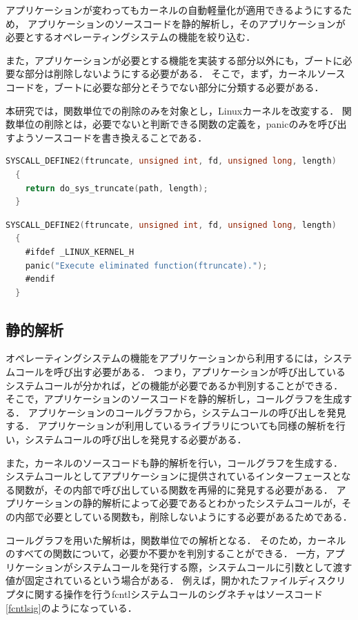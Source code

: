 \documentclass[graduation-thesis]{mlarticle}
\begin{document}
アプリケーションが変わってもカーネルの自動軽量化が適用できるようにするため，
アプリケーションのソースコードを静的解析し，そのアプリケーションが必要とするオペレーティングシステムの機能を絞り込む．

また，アプリケーションが必要とする機能を実装する部分以外にも，ブートに必要な部分は削除しないようにする必要がある．
そこで，まず，カーネルソースコードを，ブートに必要な部分とそうでない部分に分類する必要がある．

本研究では，関数単位での削除のみを対象とし，Linuxカーネルを改変する．
関数単位の削除とは，必要でないと判断できる関数の定義を，panicのみを呼び出すようソースコードを書き換えることである．

\begin{lstlisting}[language=C, caption=ftruncate関数(改変前), label=code:before]
  SYSCALL_DEFINE2(ftruncate, unsigned int, fd, unsigned long, length)
  {
    return do_sys_truncate(path, length);
  }
\end{lstlisting}
\begin{lstlisting}[language=C, caption=ftruncate関数(改変後), label=code:before]
  SYSCALL_DEFINE2(ftruncate, unsigned int, fd, unsigned long, length)
  {
    #ifdef _LINUX_KERNEL_H
    panic("Execute eliminated function(ftruncate).");
    #endif
  }
\end{lstlisting}

\subsection{静的解析}
\label{proposal:static}
オペレーティングシステムの機能をアプリケーションから利用するには，システムコールを呼び出す必要がある．
つまり，アプリケーションが呼び出しているシステムコールが分かれば，どの機能が必要であるか判別することができる．
そこで，アプリケーションのソースコードを静的解析し，コールグラフを生成する．
アプリケーションのコールグラフから，システムコールの呼び出しを発見する．
アプリケーションが利用しているライブラリについても同様の解析を行い，システムコールの呼び出しを発見する必要がある．

また，カーネルのソースコードも静的解析を行い，コールグラフを生成する．
システムコールとしてアプリケーションに提供されているインターフェースとなる関数が，その内部で呼び出している関数を再帰的に発見する必要がある．
アプリケーションの静的解析によって必要であるとわかったシステムコールが，その内部で必要としている関数も，削除しないようにする必要があるためである．

コールグラフを用いた解析は，関数単位での解析となる．
そのため，カーネルのすべての関数について，必要か不要かを判別することができる．
一方，アプリケーションがシステムコールを発行する際，システムコールに引数として渡す値が固定されているという場合がある．
例えば，開かれたファイルディスクリプタに関する操作を行うfcntlシステムコールのシグネチャはソースコード\ref{fcntlsig}のようになっている．
\end{document}
